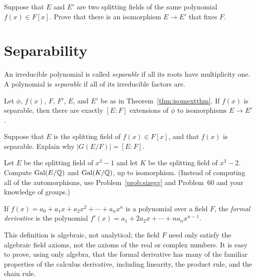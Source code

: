 \begin{problem}
    Suppose that $E$ and $E'$ are two splitting fields of the same polynomial $f(x)\in F[x]$. Prove that there is an isomorphism $E \longrightarrow E'$ that fixes $F$.
\end{problem}




\section{Separability}

\begin{definition}
An irreducible polynomial is called \emph{separable} if all its roots have multiplicity one. A polynomial is \emph{separable} if all of its irreducible factors are.
\end{definition}
\begin{theorem}
    Let $\phi$, $f(x)$, $F$, $F'$, $E$, and $E'$ be as in Theorem~\ref{thm:isomextthm}. If $f(x)$ is separable, then there are exactly $[E:F]$ extensions of $\phi$ to isomorphisms $E \longrightarrow E'$.
    \label{thm:numexts}
\end{theorem}

\begin{problem}\label{prob:sizegg}
Suppose that $E$ is the splitting field of $f(x) \in F[x]$, and that $f(x)$ is separable.  Explain why $\lvert G(E/F) \rvert = [E:F]$.
\end{problem}



\begin{problem}
    Let $E$ be the splitting field of $x^3-1$ and let $K$ be the splitting field of $x^3-2$. Compute $\operatorname{Gal}(E/\mathbb{Q})$ and $\operatorname{Gal}(K/\mathbb{Q})$, up to isomorphism. (Instead of computing all of the automorphisms, use Problem~\ref{prob:sizegg} and Problem~60 and your knowledge of groups.)
\end{problem}



\begin{definition}
    If $f(x) = a_0 + a_1 x + a_2 x^2 + \cdots + a_n x^n$ is a polynomial over a field $F$, the \emph{formal derivative} is the polynomial $f'(x) = a_1 + 2 a_2 x + \cdots + n a_{n} x^{n-1}$.
\end{definition}

This definition is algebraic, not analytical; the field $F$ need only satisfy the algebraic field axioms, not the axioms of the real or complex numbers. It is easy to prove, using only algebra, that the formal derivative has many of the familiar properties of the calculus derivative, including linearity, the product rule, and the chain rule.


